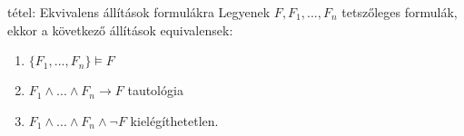 \documentclass{beamer}
\begin{document}
\begin{frame}

\begin{block}{tétel: Ekvivalens állítások formulákra}
Legyenek $F, F_1, ... , F_n$ tetszőleges formulák, ekkor a következő állítások equivalensek:
\begin{enumerate}
\item $\{F_1, ... , F_n\} \models F$
\item $F_1 \land ... \land F_n \rightarrow F$ tautológia
\item $F_1 \land ... \land F_n \land \neg F$ kielégíthetetlen.
\end{enumerate}
\end{block}

\end{frame}

\begin{frame}


\end{frame}
\end{document}
